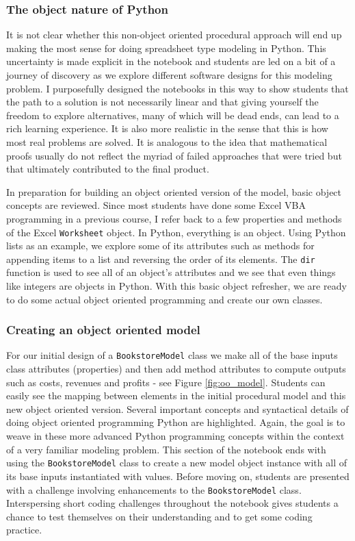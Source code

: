 \documentclass[ited]{informs3}                      %
\newcommand{\code}[1]{\texttt{#1}}
\begin{document}
\subsubsection{The object nature of Python}

It is not clear whether this non-object oriented procedural approach will end up making the most sense for doing spreadsheet type modeling in Python. This uncertainty is made explicit in the notebook and students are led on a bit of a journey of discovery as we explore different software designs for this modeling problem. I purposefully designed the notebooks in this way to show students that the path to a solution is not necessarily linear and that giving yourself the freedom to explore alternatives, many of which will be dead ends, can lead to a rich learning experience. It is also more realistic in the sense that this is how most real problems are solved. It is analogous to the idea that mathematical proofs usually do not reflect the myriad of failed approaches that were tried but that ultimately contributed to the final product.

In preparation for building an object oriented version of the model, basic object concepts are reviewed. Since most students have done some Excel VBA programming in a previous course, I refer back to a few properties and methods of the Excel \code{Worksheet} object. In Python, everything is an object. Using Python lists as an example, we explore some of its attributes such as methods for appending items to a list and reversing the order of its elements. The \code{dir} function is used to see all of an object's attributes and we see that even things like integers are objects in Python. With this basic object refresher, we are ready to do some actual object oriented programming and create our own classes.

\subsubsection{Creating an object oriented model}

For our initial design of a \code{BookstoreModel} class we make all of the base inputs class attributes (properties) and then add method attributes to compute outputs such as costs, revenues and profits - see Figure \ref{fig:oo_model}. Students can easily see the mapping between elements in the initial procedural model and this new object oriented version. Several important concepts and syntactical details of doing object oriented programming Python are highlighted. Again, the goal is to weave in these more advanced Python programming concepts within the context of a very familiar modeling problem. This section of the notebook ends with using the \code{BookstoreModel} class to create a new model object instance with all of its base inputs instantiated with values. Before moving on, students are presented with a challenge involving enhancements to the \code{BookstoreModel} class. Interspersing short coding challenges throughout the notebook gives students a chance to test themselves on their understanding and to get some coding practice.
\end{document}
